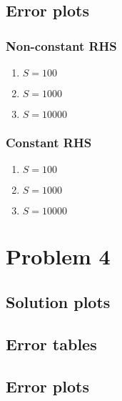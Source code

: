 \documentclass{report}
\begin{document}
\section*{Error plots}
\subsection*{Non-constant RHS}
\begin{enumerate}
  \item $S = 100$
  \item $S = 1000$
  \item $S = 10000$
\end{enumerate}
\subsection*{Constant RHS}
\begin{enumerate}
  \item $S = 100$
  \item $S = 1000$
  \item $S = 10000$
\end{enumerate}


\chapter*{Problem 4}
\section*{Solution plots}
\section*{Error tables}
\section*{Error plots}
\end{document}
